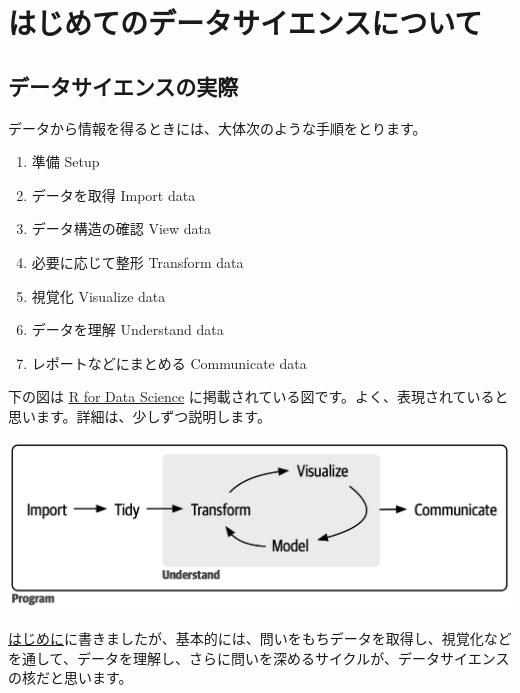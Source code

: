 \documentclass[
  xelatex, ja=standard]{bxjsbook}
\providecommand{\tightlist}{%
  \setlength{\itemsep}{0pt}\setlength{\parskip}{0pt}}
\theoremstyle{definition}
\theoremstyle{definition}
\theoremstyle{definition}
\theoremstyle{definition}
\theoremstyle{remark}
\begin{document}
\hypertarget{ux306fux3058ux3081ux3066ux306eux30c7ux30fcux30bfux30b5ux30a4ux30a8ux30f3ux30b9ux306bux3064ux3044ux3066}{%
\section{はじめてのデータサイエンスについて}\label{ux306fux3058ux3081ux3066ux306eux30c7ux30fcux30bfux30b5ux30a4ux30a8ux30f3ux30b9ux306bux3064ux3044ux3066}}

\hypertarget{ux30c7ux30fcux30bfux30b5ux30a4ux30a8ux30f3ux30b9ux306eux5b9fux969b-1}{%
\subsection{データサイエンスの実際}\label{ux30c7ux30fcux30bfux30b5ux30a4ux30a8ux30f3ux30b9ux306eux5b9fux969b-1}}

データから情報を得るときには、大体次のような手順をとります。

\begin{enumerate}
\def\labelenumi{\arabic{enumi}.}
\tightlist
\item
  準備 Setup
\item
  データを取得 Import data
\item
  データ構造の確認 View data
\item
  必要に応じて整形 Transform data
\item
  視覚化 Visualize data
\item
  データを理解 Understand data
\item
  レポートなどにまとめる Communicate data
\end{enumerate}

下の図は \href{https://r4ds.hadley.nz}{R for Data Science} に掲載されている図です。よく、表現されていると思います。詳細は、少しずつ説明します。

\includegraphics[width=1\linewidth]{./data/base}

\href{https://icu-hsuzuki.github.io/ds4aj/introduction.html\#introduction}{はじめに}に書きましたが、基本的には、問いをもちデータを取得し、視覚化などを通して、データを理解し、さらに問いを深めるサイクルが、データサイエンスの核だと思います。
\end{document}
